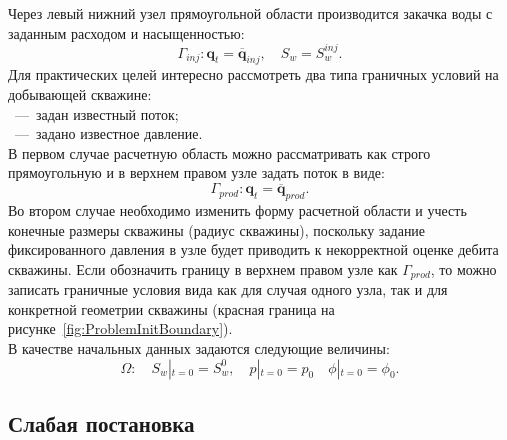 Через левый нижний узел прямоугольной области производится закачка воды с заданным 
расходом и насыщенностью:
\begin{equation}\label{eq:GammaL}
	\Gamma_{inj}: \bm{q}_{t} = \overline{\bm{q}}_{inj}, \quad S_w = S_w^{inj}.
\end{equation}
Для практических целей интересно рассмотреть два типа граничных условий на добывающей скважине:\\
~---~задан известный поток;\\
~---~задано известное давление.\\
В первом случае расчетную область можно рассматривать как строго прямоугольную и в верхнем правом узле
задать поток в виде:
\begin{equation}\label{eq:GammaR}
	\Gamma_{prod}: \bm{q}_{t} = \overline{\bm{q}}_{prod}.
\end{equation}
Во втором случае необходимо изменить форму расчетной области и учесть конечные размеры скважины 
(радиус скважины), поскольку задание фиксированного давления в узле будет приводить к 
некорректной оценке дебита скважины. Если обозначить границу в верхнем правом узле как $\Gamma_{prod}$,
то можно записать граничные условия вида  как для случая одного узла, так и для 
конкретной геометрии скважины (красная граница на рисунке~\ref{fig:ProblemInitBoundary}).\\
В качестве начальных данных задаются следующие величины:
\begin{equation}\label{eq:init_cond}
	\Omega: \quad S_w\left|_{t=0} = S_w^0\right., \quad p\left|_{t=0} = p_0\right.  \quad \phi\left|_{t=0} = \phi_0\right..
\end{equation}



\subsection{Слабая постановка}


